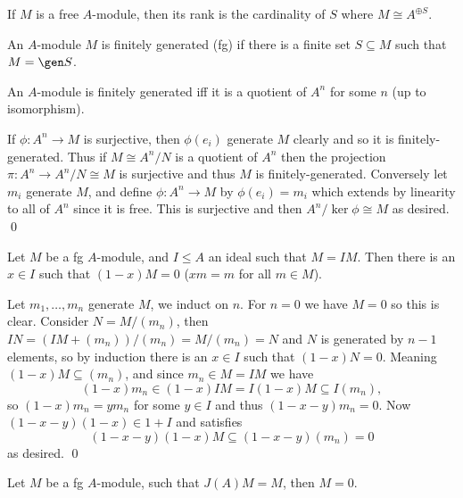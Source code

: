 \eproof

\bdefn

    If $M$ is a free $A$-module, then its {\emphcolor rank} is the cardinality of $S$ where $M\cong A^{\oplus S}$.

\edefn

\bdefn

    An $A$-module $M$ is {\emphcolor finitely generated} ({\emphcolor fg}) if there is a finite set $S\subseteq M$ such that $M=\gen S$.

\edefn

\bprop

    An $A$-module is finitely generated iff it is a quotient of $A^n$ for some $n$ (up to isomorphism).

\eprop

\bproof

    If $\phi\colon A^n\to M$ is surjective, then $\phi(e_i)$ generate $M$ clearly and so it is finitely-generated.
    Thus if $M\cong A^n/N$ is a quotient of $A^n$ then the projection $\pi\colon A^n\to A^n/N\cong M$ is surjective and thus $M$
    is finitely-generated.
    Conversely let $m_i$ generate $M$, and define $\phi\colon A^n\to M$ by $\phi(e_i)=m_i$ which extends by linearity to all of $A^n$ since
    it is free.
    This is surjective and then $A^n/\ker\phi\cong M$ as desired.
    \qed

\eproof

\bprop

    Let $M$ be a fg $A$-module, and $I\leq A$ an ideal such that $M=IM$.
    Then there is an $x\in I$ such that $(1-x)M=0$ ($xm=m$ for all $m\in M$).

\eprop

\bproof

    Let $m_1,\dots,m_n$ generate $M$, we induct on $n$.
    For $n=0$ we have $M=0$ so this is clear.
    Consider $N=M/(m_n)$, then $IN=(IM+(m_n))/(m_n)=M/(m_n)=N$ and $N$ is generated by $n-1$ elements, so by induction there is an $x\in I$
    such that $(1-x)N=0$.
    Meaning $(1-x)M\subseteq(m_n)$, and since $m_n\in M=IM$ we have
    $$ (1-x)m_n \in (1-x)IM = I(1-x)M \subseteq I(m_n), $$
    so $(1-x)m_n=ym_n$ for some $y\in I$ and thus $(1-x-y)m_n=0$.
    Now $(1-x-y)(1-x)\in 1+I$ and satisfies
    $$ (1-x-y)(1-x)M \subseteq (1-x-y)(m_n) = 0 $$
    as desired.
    \qed

\eproof

\bcoro[title=Nakayama's lemma]

    Let $M$ be a fg $A$-module, such that $J(A)M=M$, then $M=0$.

